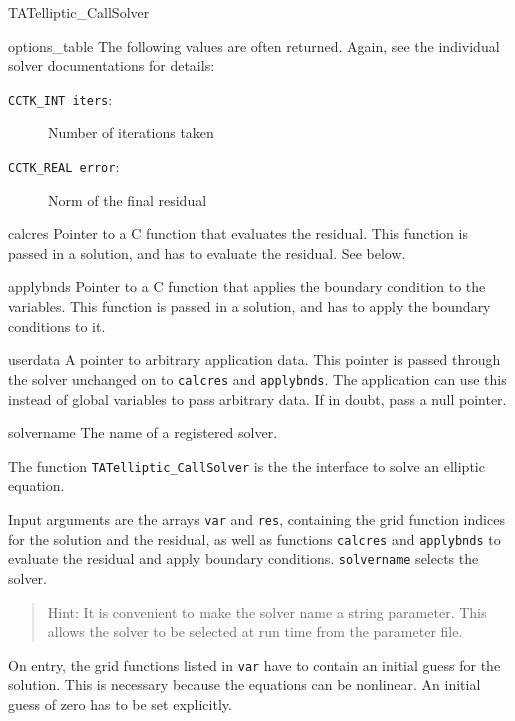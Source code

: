 \begin{FunctionDescription}{TATelliptic\_CallSolver}
\begin{ParameterSection}
\begin{Parameter}{options\_table}
The following values are often returned.  Again, see the individual
solver documentations for details:
\begin{description}
\item[\texttt{CCTK\_INT iters}:] Number of iterations taken
\item[\texttt{CCTK\_REAL error}:] Norm of the final residual
\end{description}
\end{Parameter}
\begin{Parameter}{calcres}
Pointer to a C function that evaluates the residual.  This function is
passed in a solution, and has to evaluate the residual.  See below.
\end{Parameter}
\begin{Parameter}{applybnds}
Pointer to a C function that applies the boundary condition to the
variables.  This function is passed in a solution, and has to apply
the boundary conditions to it.
\end{Parameter}
\begin{Parameter}{userdata}
A pointer to arbitrary application data.  This pointer is passed
through the solver unchanged on to \texttt{calcres} and
\texttt{applybnds}.  The application can use this instead of global
variables to pass arbitrary data.  If in doubt, pass a null pointer.
\end{Parameter}
\begin{Parameter}{solvername}
The name of a registered solver.
\end{Parameter}
\end{ParameterSection}

\begin{Discussion}
The function \texttt{TATelliptic\_CallSolver} is the the interface to
solve an elliptic equation.

Input arguments are the arrays \texttt{var} and \texttt{res},
containing the grid function indices for the solution and the
residual, as well as functions \texttt{calcres} and \texttt{applybnds}
to evaluate the residual and apply boundary conditions.
\texttt{solvername} selects the solver.

\begin{quote}
Hint: It is convenient to make the solver name a string parameter.
This allows the solver to be selected at run time from the parameter
file.
\end{quote}

On entry, the grid functions listed in \texttt{var} have to contain an
initial guess for the solution.  This is necessary because the
equations can be nonlinear.  An initial guess of zero has to be set
explicitly.


\end{Discussion}
\end{FunctionDescription}
